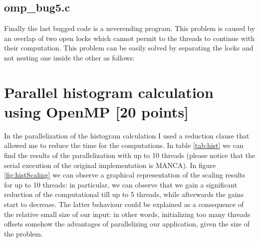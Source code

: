 \documentclass[unicode,11pt,a4paper,oneside,numbers=endperiod,openany]{scrartcl}
\begin{document}


\subsection{omp\_bug5.c}
Finally the last bugged code is a neverending program. This problem is caused by an overlap of two open locks which cannot permit to the threads to continue with their computation. This problem can be easily solved by separating the locks and not nesting one inside the other as follows:\\







\section{Parallel histogram calculation using OpenMP [20 points]}
In the parallelization of the histogram calculation I used a reduction clause that allowed me to reduce the time for the computations. In table \ref{tab:hist} we can find the results of the parallelization with up to 10 threads (please notice that the serial execution of the original implementation is MANCA). In figure \ref{fig:histScaling} we can observe a graphical representation of the scaling results for up to 10 threads: in particular, we can observe that we gain a significant reduction of the computational till up to 5 threads, while afterwards the gains start to decrease. The latter behaviour could be explained as a consequence of the relative small size of our input: in other words, initializing too many threads offsets somehow the advantages of parallelizing our application, given the size of the problem.


\end{document}
